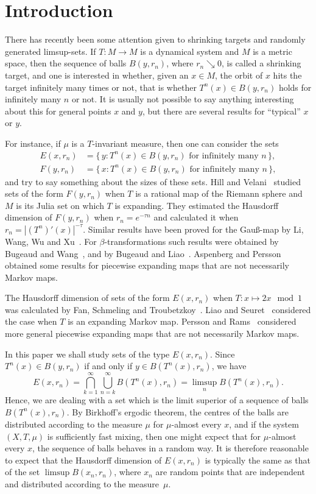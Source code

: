\section{Introduction}

There has recently been some attention given to shrinking targets and randomly generated limsup-sets. If $T \colon M \to M$ is a dynamical system and $M$ is a metric space, then the sequence of balls $B(y,r_n)$, where $r_n \searrow 0$, is called a shrinking target, and one is interested in whether, given an $x \in M$, the orbit of $x$ hits the target infinitely many times or not, that is whether $T^n(x)
\in B(y,r_n)$ holds for infinitely many $n$ or not. It is usually not possible to say anything interesting about this for general points $x$ and $y$, but there are several results for ``typical'' $x$ or $y$.

For instance, if $\mu$ is a $T$-invariant measure, then one can consider the sets
\begin{align*}
E (x,r_n) &= \{\, y : T^n (x) \in B(y,r_n) \text{ for infinitely many } n \,\},\\ F (y,r_n) &= \{\, x : T^n (x) \in B(y,r_n) \text{ for infinitely many } n \,\},
\end{align*}
and try to say something about the sizes of these sets. Hill and Velani~\cite{hillvelani} studied sets of the form $F(y, r_n)$ when $T$ is a rational map of the Riemann sphere and $M$ is its Julia set on which $T$ is expanding. They estimated the Hausdorff dimension of $F(y,r_n)$ when $r_n = e^{-\tau n}$ and calculated it when $r_n = |(T^n)' (x)|^{-\tau}$. Similar results have been proved for the Gau\ss-map by Li, Wang, Wu and Xu~\cite{liwangwuxu}. For $\beta$-transformations such results were obtained by Bugeaud and Wang~\cite{bugeaudwang}, and by Bugeaud and Liao~\cite{bugeaudliao}. Aspenberg and Persson~\cite{aspenbergpersson} obtained some results for piecewise expanding maps that are not necessarily Markov maps.

The Hausdorff dimension of sets of the form $E(x,r_n)$ when $T \colon x \mapsto 2x \mod 1$ was calculated by Fan, Schmeling and Troubetzkoy~\cite{fanschmelingtroubetzkoy}. Liao and Seuret~\cite{liaoseuret} considered the case when $T$ is an expanding Markov map. Persson and Rams~\cite{perssonrams} considered more general piecewise expanding maps that are not necessarily Markov maps.

In this paper we shall study sets of the type $E (x,r_n)$. Since $T^n (x) \in B(y,r_n)$ if and only if $y \in B(T^n(x),r_n)$, we have
\[
E(x,r_n) = \bigcap_{k=1}^\infty \bigcup_{n=k}^\infty B(T^n(x),r_n) =
\limsup_n B(T^n(x),r_n).
\]
Hence, we are dealing with a set which is the limit superior of a sequence of balls $B(T^n(x),r_n)$. By Birkhoff's ergodic theorem, the centres of the balls are distributed according to the measure $\mu$ for $\mu$-almost every $x$, and if the system $(X,T,\mu)$ is sufficiently fast mixing, then one might expect that for $\mu$-almost every $x$, the sequence of balls behaves in a random way. It is therefore reasonable to expect that the Hausdorff dimension of $E(x,r_n)$ is typically the same as that of the set $\limsup B(x_n,r_n)$, where $x_n$ are random points that are independent and distributed according to the measure~$\mu$.

